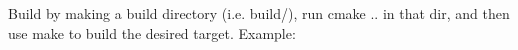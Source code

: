 Build by making a build directory (i.\+e. {\ttfamily build/}), run {\ttfamily cmake ..} in that dir, and then use {\ttfamily make} to build the desired target. Example\+:


\begin{DoxyCode}{0}
\end{DoxyCode}
 